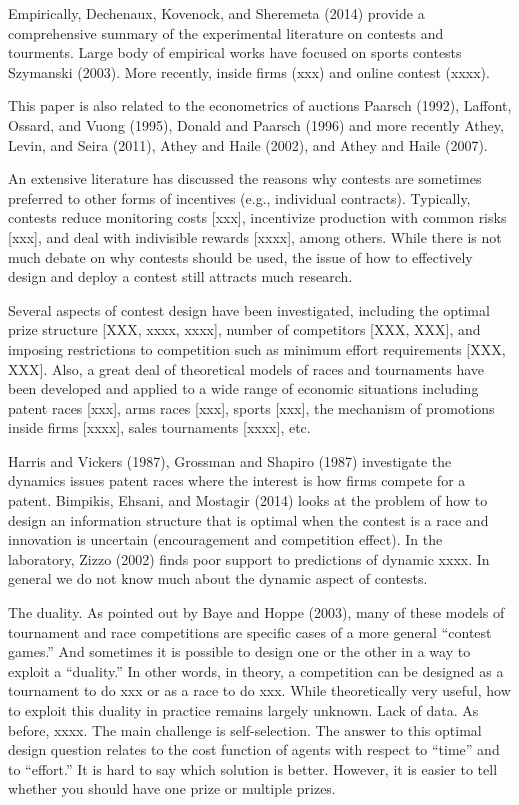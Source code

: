 \documentclass[11pt, titlepage]{article}
\begin{document}
Empirically, Dechenaux, Kovenock, and Sheremeta (2014) provide a
comprehensive summary of the experimental literature on contests and
tourments. Large body of empirical works have focused on sports contests
Szymanski (2003). More recently, inside firms (xxx) and online contest
(xxxx).

This paper is also related to the econometrics of auctions Paarsch
(1992), Laffont, Ossard, and Vuong (1995), Donald and Paarsch (1996) and
more recently Athey, Levin, and Seira (2011), Athey and Haile (2002),
and Athey and Haile (2007).

An extensive literature has discussed the reasons why contests are
sometimes preferred to other forms of incentives (e.g., individual
contracts). Typically, contests reduce monitoring costs {[}xxx{]},
incentivize production with common risks {[}xxx{]}, and deal with
indivisible rewards {[}xxxx{]}, among others. While there is not much
debate on why contests should be used, the issue of how to effectively
design and deploy a contest still attracts much research.

Several aspects of contest design have been investigated, including the
optimal prize structure {[}XXX, xxxx, xxxx{]}, number of competitors
{[}XXX, XXX{]}, and imposing restrictions to competition such as minimum
effort requirements {[}XXX, XXX{]}. Also, a great deal of theoretical
models of races and tournaments have been developed and applied to a
wide range of economic situations including patent races {[}xxx{]}, arms
races {[}xxx{]}, sports {[}xxx{]}, the mechanism of promotions inside
firms {[}xxxx{]}, sales tournaments {[}xxxx{]}, etc.

Harris and Vickers (1987), Grossman and Shapiro (1987) investigate the
dynamics issues patent races where the interest is how firms compete for
a patent. Bimpikis, Ehsani, and Mostagir (2014) looks at the problem of
how to design an information structure that is optimal when the contest
is a race and innovation is uncertain (encouragement and competition
effect). In the laboratory, Zizzo (2002) finds poor support to
predictions of dynamic xxxx. In general we do not know much about the
dynamic aspect of contests.

The duality. As pointed out by Baye and Hoppe (2003), many of these
models of tournament and race competitions are specific cases of a more
general ``contest games.'' And sometimes it is possible to design one or
the other in a way to exploit a ``duality.'' In other words, in theory,
a competition can be designed as a tournament to do xxx or as a race to
do xxx. While theoretically very useful, how to exploit this duality in
practice remains largely unknown. Lack of data. As before, xxxx. The
main challenge is self-selection. The answer to this optimal design
question relates to the cost function of agents with respect to ``time''
and to ``effort.'' It is hard to say which solution is better. However,
it is easier to tell whether you should have one prize or multiple
prizes.
\end{document}
